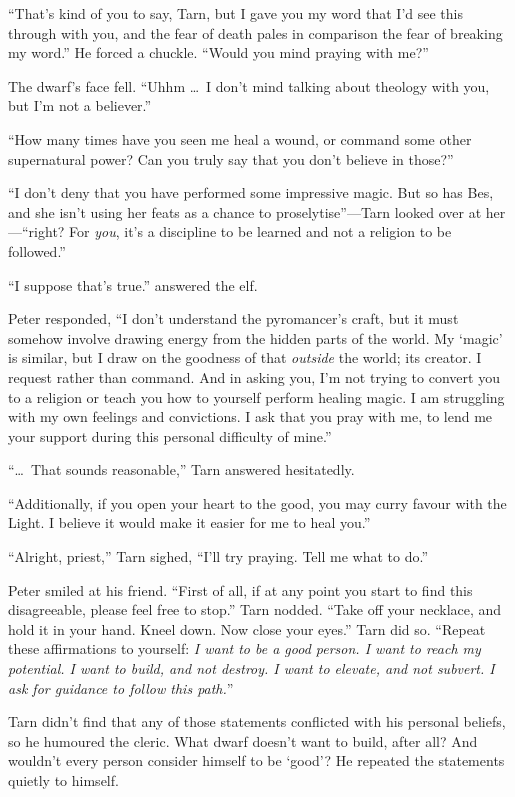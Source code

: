 ``That's kind of you to say, Tarn, but I gave you my word that I'd see this through with you, and the fear of death pales in comparison the fear of breaking my word.''  He forced a chuckle.  ``Would you mind praying with me?''

The dwarf's face fell.  ``Uhhm \ldots\ I don't mind talking about theology with you, but I'm not a believer.''

``How many times have you seen me heal a wound, or command some other supernatural power?  Can you truly say that you don't believe in those?''

``I don't deny that you have performed some impressive magic.  But so has Bes, and she isn't using her feats as a chance to proselytise''---Tarn looked over at her---``right?  For \emph{you}, it's a discipline to be learned and not a religion to be followed.''

``I suppose that's true.'' answered the elf.

Peter responded, ``I don't understand the pyromancer's craft, but it must somehow involve drawing energy from the hidden parts of the world.  My `magic' is similar, but I draw on the goodness of that \emph{outside} the world; its creator.  I request rather than command.  And in asking you, I'm not trying to convert you to a religion or teach you how to yourself perform healing magic.  I am struggling with my own feelings and convictions. I ask that you pray with me, to lend me your support during this personal difficulty of mine.''

``\ldots\ That sounds reasonable,'' Tarn answered hesitatedly.

``Additionally, if you open your heart to the good, you may curry favour with the Light.  I believe it would make it easier for me to heal you.''

``Alright, priest,'' Tarn sighed, ``I'll try praying.  Tell me what to do.''

Peter smiled at his friend.  ``First of all, if at any point you start to find this disagreeable, please feel free to stop.''  Tarn nodded.  ``Take off your necklace, and hold it in your hand.  Kneel down.  Now close your eyes.''  Tarn did so.  ``Repeat these affirmations to yourself: \emph{I want to be a good person.  I want to reach my potential.  I want to build, and not destroy.  I want to elevate, and not subvert.  I ask for guidance to follow this path.}''

Tarn didn't find that any of those statements conflicted with his personal beliefs, so he humoured the cleric.  What dwarf doesn't want to build, after all?  And wouldn't every person consider himself to be `good'?  He repeated the statements quietly to himself.

